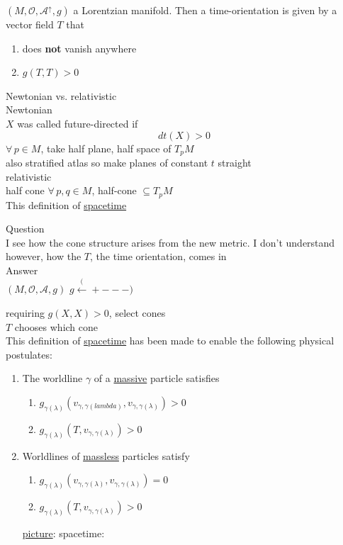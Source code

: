 	\begin{definition}
		$(M,\mathcal{O},\mathcal{A}^{\uparrow},g)$ a Lorentzian manifold.  Then a time-orientation is given by a vector field $T$ that 
		\begin{enumerate}
			\item[(i)] does \textbf{not} vanish anywhere 
			\item[(ii)] $g(T,T)>0$
		\end{enumerate}
	\end{definition}
	
	Newtonian vs. relativistic \\
	Newtonian \\
	$X$ was called future-directed if 
	\[
	dt(X) >0
	\]
	$\forall \, p \in M$, take half plane, half space of $T_pM$ \\
	also stratified atlas so make planes of constant $t$ straight \\
	relativistic \\
	half cone $\forall \, p, q \in M$, half-cone $\subseteq T_pM$ \\
	
	This definition of \underline{spacetime}
	
	Question \\
	I see how the cone structure arises from the new metric. I don't understand however, how the $T$, the time orientation, comes in \\
	
	Answer \\
	$(M,\mathcal{O}, \mathcal{A},g)$ $g \xleftarrow (+---)$
	
	requiring $g(X,X)>0$, select cones \\
	$T$ chooses which cone \\
	
	This definition of \underline{spacetime} has been made to enable the following physical postulates:
	\begin{enumerate}
		\item[(P1)] The worldline $\gamma$ of a \underline{massive} particle satisfies
		\begin{enumerate}
			\item[(i)] $g_{\gamma(\lambda)}(v_{\gamma, \gamma(lambda)} , v_{\gamma,\gamma(\lambda)} ) >0$
			\item[(ii)] $g_{\gamma(\lambda)}(T, v_{\gamma,\gamma(\lambda)}) >0$
		\end{enumerate}
		\item[(P2)] Worldlines of \underline{massless} particles satisfy
		\begin{enumerate}
			\item[(i)] $g_{\gamma(\lambda)}(v_{\gamma,\gamma(\lambda)}, v_{\gamma,\gamma(\lambda)}) = 0$
			\item[(ii)] $g_{\gamma(\lambda)}(T,v_{\gamma,\gamma(\lambda)}) >0$
		\end{enumerate}
		\underline{picture}: spacetime:
	\end{enumerate}
	
